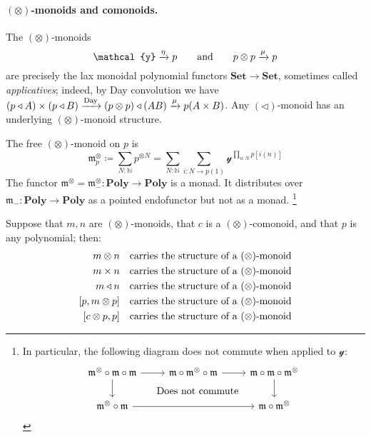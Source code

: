 \documentclass[11pt, one side, article]{memoir}
\theoremstyle{definition}
\theoremstyle{plain}
\newcommand{\Cat}[1]{\mathbf{#1}}%
\newcommand{\To}[2][]{\xrightarrow[#1]{\tn{$#2$}}}
\newcommand{\tn}[1]{\textnormal{#1}}
\newcommand{\nn}{\mathbb{N}}
\newcommand{\smset}{\Cat{Set}}
\newcommand{\yon}{{\mathcal{y}}}
\newcommand{\poly}{\Cat{Poly}}
\newcommand{\0}{\textsf{0}}
\newcommand{\1}{\tn{\textsf{1}}}
\newcommand{\tri}{\mathbin{\triangleleft}}
\newcommand{\free}{\mathfrak{m}}
\newcommand{\freecol}{\mathfrak{m}^\otimes}
\newcommand{\hh}[2][]{#1 \tn{#2} #1}
\newcommand{\qqand}{\hh[\qquad]{and}}
\begin{document}
\paragraph{$(\otimes)$-monoids and comonoids.}
The $(\otimes)$-monoids
\begin{equation}\label{eqn.otimes_monoids}
	\yon\To{\eta} p
	\qqand
	p\otimes p\To{\mu} p
\end{equation}
are precisely the lax monoidal polynomial functors $\smset\to\smset$, sometimes called \emph{applicatives}; indeed, by Day convolution we have $(p\tri A)\times (p\tri B)\To{\text{Day}} (p\otimes p)\tri(AB)\To{\mu}p(A\times B)$. Any $(\tri)$-monoid has an underlying $(\otimes)$-monoid structure.

The free $(\otimes)$-monoid on $p$ is 
\begin{equation}
	\freecol_p\coloneqq\sum_{N:\nn}p^{\otimes N}=\sum_{N:\nn}\sum_{i\colon N\to p(1)}\yon^{\prod_{n:N}p[i(n)]}
\end{equation}
The functor $\freecol=\freecol_-\colon\poly\to\poly$ is a monad. It distributes 
over $\free_-\colon\poly\to\poly$ as a pointed endofunctor but not as a monad.%
\footnote{In particular, the following diagram does not commute when applied to $\yon$:
\[
\begin{tikzcd}[ampersand replacement=\&]
  \freecol\circ\free\circ\free\ar[r]\ar[d]\&
  \free\circ\freecol\circ\free\ar[r]\&
  \free\circ\free\circ\freecol\ar[d]\\
  \freecol\circ\free\ar[rr]\&\&
  \free\circ\freecol\ar[ull, phantom, "\text{Does not commute}"]
\end{tikzcd}
\]
}

Suppose that $m,n$ are $(\otimes)$-monoids, that $c$ is a $(\otimes)$-comonoid, and that $p$ is any polynomial; then:
\begin{align}
	m\otimes n&\quad\tn{carries the structure of a $(\otimes)$-monoid}\\
	m\times n&\quad\tn{carries the structure of a $(\otimes)$-monoid}\\
	m\tri n&\quad\tn{carries the structure of a $(\otimes)$-monoid}\\
	[p, m\otimes p]&\quad\tn{carries the structure of a $(\otimes)$-monoid}\\
	[c\otimes p, p]&\quad\tn{carries the structure of a $(\otimes)$-monoid}
\end{align}
 
\end{document}
